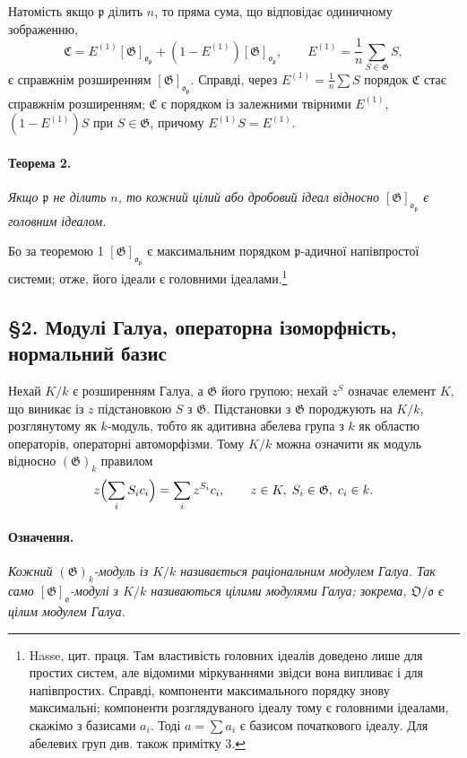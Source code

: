 \documentclass[11pt]{article}
\providecommand{\frakO}{\mathfrak{O}}
\providecommand{\frako}{\mathfrak{o}}
\providecommand{\frakp}{\mathfrak{p}}
\providecommand{\Gg}{\mathfrak{G}}
\begin{document}
Натомість якщо \(\frakp\) ділить \(n\), то пряма сума, що відповідає одиничному зображенню,
\[
        \mathfrak C=E^{(1)}[\Gg]_{\frako_\frakp}+(1-E^{(1)})[\Gg]_{\frako_\frakp},
        \qquad
        E^{(1)}=\frac1n\sum_{S\in\Gg} S,
\]
є справжнім розширенням \([\Gg]_{\frako_\frakp}\). Справді, через \(E^{(1)}=\frac1n\sum S\) порядок \(\mathfrak C\) стає справжнім розширенням; \(\mathfrak C\) є порядком із залежними твірними \(E^{(1)}\), \((1-E^{(1)})S\) при \(S\in\Gg\), причому \(E^{(1)}S=E^{(1)}\).

\paragraph{Теорема 2.}
\emph{Якщо \(\frakp\) не ділить \(n\), то кожний цілий або дробовий ідеал відносно \([\Gg]_{\frako_\frakp}\) є головним ідеалом.}

Бо за теоремою 1 \([\Gg]_{\frako_\frakp}\) є максимальним порядком \(\frakp\)-адичної напівпростої системи; отже, його ідеали є головними ідеалами.\footnote{Hasse, цит. праця. Там властивість головних ідеалів доведено лише для простих систем, але відомими міркуваннями звідси вона випливає і для напівпростих. Справді, компоненти максимального порядку знову максимальні; компоненти розглядуваного ідеалу тому є головними ідеалами, скажімо з базисами \(a_i\). Тоді \(a=\sum a_i\) є базисом початкового ідеалу. Для абелевих груп див. також примітку 3.}

\subsection*{§2. Модулі Галуа, операторна ізоморфність, нормальний базис}

Нехай \(K/k\) є розширенням Галуа, а \(\Gg\) його групою; нехай \(z^S\) означає елемент \(K\), що виникає із \(z\) підстановкою \(S\) з \(\Gg\). Підстановки з \(\Gg\) породжують на \(K/k\), розглянутому як \(k\)-модуль, тобто як адитивна абелева група з \(k\) як областю операторів, операторні автоморфізми. Тому \(K/k\) можна означити як модуль відносно \((\Gg)_k\) правилом
\[
        z\Bigl(\sum_i S_i c_i\Bigr)=\sum_i z^{S_i}c_i,
        \qquad z\in K,\; S_i\in\Gg,\; c_i\in k.
\]

\paragraph{Означення.}
\emph{Кожний \((\Gg)_k\)-модуль із \(K/k\) називається раціональним модулем Галуа. Так само \([\Gg]_\frako\)-модулі з \(K/k\) називаються цілими модулями Галуа; зокрема, \(\frakO/\frako\) є цілим модулем Галуа.}
\end{document}
